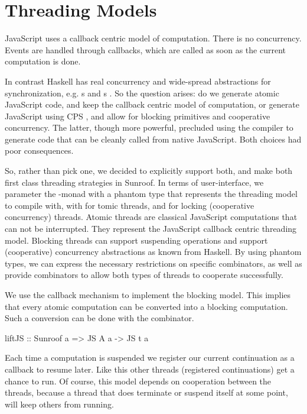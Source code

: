  
\section{Threading Models}
\label{sec:threading-models}

JavaScript uses a callback centric model of computation. There
is no concurrency. Events are handled through callbacks,
which are called as soon as the current computation is done.

In contrast Haskell has real concurrency and wide-spread 
abstractions for synchronization, e.g. s and s
\cite{Jones:96:ConcurrentHaskell}.
So the question arises: do we generate atomic JavaScript code, 
and keep the callback centric model of computation, or generate JavaScript
using CPS \cite{Claessen:99:PoorMansConcurrencyMonad}, 
and allow for blocking primitives and
cooperative concurrency. The latter, though more powerful, 
precluded using the compiler to generate
code that can be cleanly called from native JavaScript.
Both choices had poor consequences.

So, rather than pick one, we decided to explicitly support both,
and make both first class threading strategies in Sunroof.
In terms of user-interface, we parameter the \JS-monad
with a phantom type that represents the threading model
to compile with, with  for tomic threads,
and  for locking (cooperative concurrency) threads. 
Atomic threads are classical JavaScript computations that
can not be interrupted. They represent the JavaScript callback
centric threading model. Blocking threads can
support suspending operations and support (cooperative) concurrency
abstractions as known from Haskell. By using phantom
types, we can express the necessary
restrictions on specific combinators, as well
as provide combinators to allow both types of
threads to cooperate successfully.

We use the callback mechanism to implement the blocking model.
This implies that every atomic computation can be converted into 
a blocking computation. Such a conversion can be done with the
 combinator.
\begin{Code}
liftJS :: Sunroof a => JS A a -> JS t a
\end{Code}
Each time a computation is suspended we register our current
continuation as a callback to resume later. Like this other 
threads (registered continuations) get a chance to run.
Of course, this model depends on cooperation between the threads,
because a thread that does terminate or suspend itself at some
point, will keep others from running.

